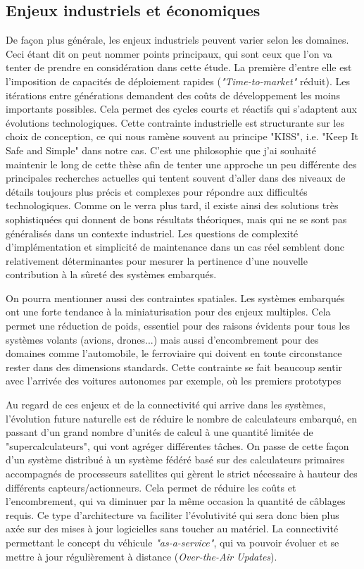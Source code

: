 


\subsection{Enjeux industriels et économiques}

De façon plus générale, les enjeux industriels peuvent varier selon les domaines. Ceci étant dit on peut nommer points principaux, qui sont ceux que l'on va tenter de prendre en considération dans cette étude. La première d'entre elle est l'imposition de capacités de déploiement rapides (\textit{"Time-to-market"} réduit). Les itérations entre générations demandent des coûts de développement les moins importants possibles. Cela permet des cycles courts et réactifs qui s'adaptent aux évolutions technologiques. Cette contrainte industrielle est structurante sur les choix de conception, ce qui nous ramène souvent au principe "KISS", i.e. "Keep It Safe and Simple" dans notre cas. C'est une philosophie que j'ai souhaité maintenir le long de cette thèse afin de tenter une approche un peu différente des principales recherches actuelles qui tentent souvent d'aller dans des niveaux de détails toujours plus précis et complexes pour répondre aux difficultés technologiques. Comme on le verra plus tard, il existe ainsi des solutions très sophistiquées qui donnent de bons résultats théoriques, mais qui ne se sont pas généralisés dans un contexte industriel. Les questions de complexité d'implémentation et simplicité de maintenance dans un cas réel semblent donc relativement déterminantes pour mesurer la pertinence d'une nouvelle contribution à la sûreté des systèmes embarqués.

On pourra mentionner aussi des contraintes spatiales. Les systèmes embarqués ont une forte tendance à la miniaturisation pour des enjeux multiples. Cela permet une réduction de poids, essentiel pour des raisons évidents pour tous les systèmes volants (avions, drones...) mais aussi d'encombrement pour des domaines comme l'automobile, le ferroviaire qui doivent en toute circonstance rester dans des dimensions standards. Cette contrainte se fait beaucoup sentir avec l'arrivée des voitures autonomes par exemple, où les premiers prototypes 


Au regard de ces enjeux et de la connectivité qui arrive dans les systèmes, l'évolution future naturelle est de réduire le nombre de calculateurs embarqué, en passant d'un grand nombre d'unités de calcul à une quantité limitée de "supercalculateurs", qui vont agréger différentes tâches. On passe de cette façon d'un système distribué à un système fédéré basé sur des calculateurs primaires accompagnés de processeurs satellites qui gèrent le strict nécessaire à hauteur des différents capteurs/actionneurs.  Cela permet de réduire les coûts et l'encombrement, qui va diminuer par la même occasion la quantité de câblages requis. Ce type d'architecture va faciliter l'évolutivité qui sera donc bien plus axée sur des mises à jour logicielles sans toucher au matériel. La connectivité permettant le concept du véhicule \textit{"as-a-service"}, qui va pouvoir évoluer et se mettre à jour régulièrement à distance (\textit{Over-the-Air Updates}). 

